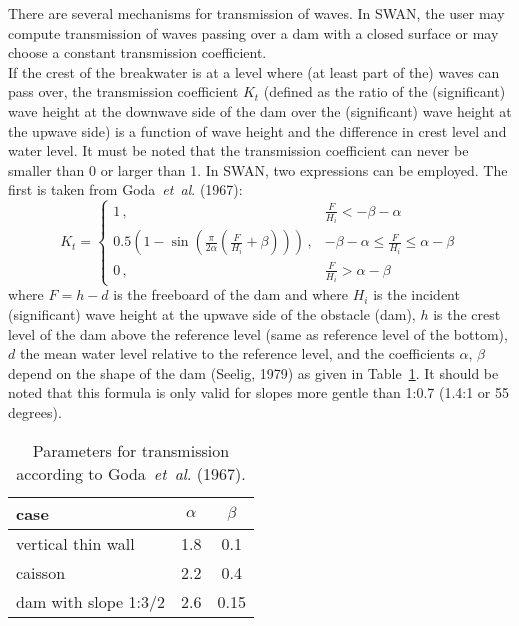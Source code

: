 \documentclass[12pt]{book}
\begin{document}
There are several mechanisms for transmission of waves. In SWAN, the user may compute transmission of waves passing
over a dam with a closed surface or may choose a constant transmission coefficient.
\\[2ex]
\noindent
If the crest of the breakwater is at a level
where (at least part of the) waves can pass over, the transmission coefficient $K_{t}$ (defined as the ratio of
the (significant) wave height at the downwave side of the dam over the (significant) wave height at the
upwave side) is a function of wave height and the difference in crest level and water level. It must be noted that
the transmission coefficient can never be smaller than 0 or larger than 1. In SWAN, two expressions
can be employed. The first is taken from Goda~{\it et~al}. (1967):
\begin{equation}
  K_t =
    \left\{
      \begin{array}{ll}
         1 \, , & \frac{F}{H_i} < -\beta - \alpha \\
         0.5 (1 - \sin(\frac{\pi}{2\alpha}(\frac{F}{H_i}+\beta)))\, , & -\beta -\alpha \leq \frac{F}{H_i} \leq \alpha - \beta \\
         0 \, , & \frac{F}{H_i} > \alpha - \beta
      \end{array}
    \right.
  \label{eq2-9}
\end{equation}
where $F=h-d$ is the freeboard of the dam and where $H_i$ is the incident (significant) wave height at the
upwave side of the obstacle (dam), $h$ is the crest level of the dam above the reference level (same as
reference level of the bottom), $d$ the mean water level relative to the reference level, and the coefficients
$\alpha$, $\beta$ depend on the shape of the dam (Seelig, 1979) as given in Table~\ref{tab:see79}. It should be
noted that this formula is only valid for slopes more gentle than 1:0.7 (1.4:1 or 55 degrees).
\begin{table}[htb]
\begin{center}
\caption{Parameters for transmission according to Goda~{\it et~al}. (1967).}
\label{tab:see79}
\begin{tabular}{l c c}
\hline
  case & $\alpha$ & $\beta$ \\
\hline
    vertical thin wall   & 1.8 & 0.1  \\
    caisson              & 2.2 & 0.4  \\
    dam with slope 1:3/2 & 2.6 & 0.15 \\
\hline
\end{tabular}
\end{center}
\end{table}
\end{document}

